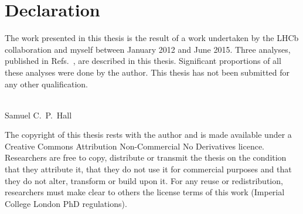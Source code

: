\clearpage
\chapter*{\centering Declaration}

\begin{center}
  {\setlength{\currentparskip}{\parskip}%
  \begin{minipage}{\abstractpagewidth}
    \setlength{\parskip}{\currentparskip}%
    The work presented in this thesis is the result of a work undertaken by the
    LHCb collaboration and myself between January 2012 and June 2015.
    Three analyses,
    published in Refs.~\cite{LHCb-PAPER-2012-025,LHCb-PAPER-2014-030,LHCb-PAPER-2015-036}, are
    described in this thesis.
    Significant proportions of all these analyses were done by the author.
    This thesis has not been submitted for any other qualification.
    \\\\
    \begin{flushright}
      Samuel C.~P.~Hall\\
      \shortdate
    \end{flushright}
  \end{minipage}

    \vfill

  \begin{minipage}{0.8\textwidth}
    \footnotesize
    The copyright of this thesis rests with the author and is made available under a Creative
    Commons Attribution Non-Commercial No Derivatives licence. Researchers are free to copy,
    distribute or transmit the thesis on the condition that they attribute it, that they do not use
    it for commercial purposes and that they do not alter, transform or build upon it. For any
    reuse or redistribution, researchers must make clear to others the license terms of this work
    (Imperial College London PhD regulations).
  \end{minipage}}
  \vspace{1.0cm}
\end{center}
